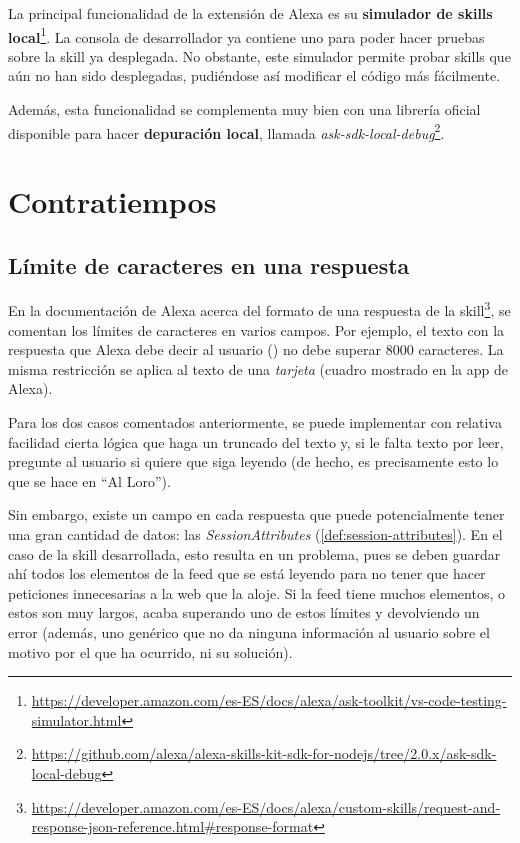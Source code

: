 \documentclass[11pt,spanish,listoffigures,listoftables,table,hyphens,dvipsnames]{tfgetsinf}
\newcommand{\fe}[1]{\foreign{english}{#1}}
\begin{document}
La principal funcionalidad de la extensión de Alexa es su
\textbf{simulador de skills local}\footnote{\url{https://developer.amazon.com/es-ES/docs/alexa/ask-toolkit/vs-code-testing-simulator.html}}.
La consola de desarrollador ya contiene uno para poder hacer pruebas sobre la skill ya desplegada. No obstante, este simulador permite probar skills que aún no han sido desplegadas, pudiéndose así modificar el código más fácilmente.

Además, esta funcionalidad se complementa muy bien con una librería oficial disponible para hacer \textbf{depuración local}, llamada \emph{ask-sdk-local-debug}\footnote{\url{https://github.com/alexa/alexa-skills-kit-sdk-for-nodejs/tree/2.0.x/ask-sdk-local-debug}}.

\section{Contratiempos}

\subsection{Límite de caracteres en una respuesta}
\label{seccion:limite-caracteres}

En la documentación de Alexa acerca del formato de una respuesta de la skill\footnote{\url{https://developer.amazon.com/es-ES/docs/alexa/custom-skills/request-and-response-json-reference.html\#response-format}}, se comentan los límites de caracteres en varios campos.
Por ejemplo, el texto con la respuesta que Alexa debe decir al usuario (\fe{outputSpeech}) no debe superar 8000 caracteres. La misma restricción se aplica al texto de una \emph{tarjeta} (cuadro mostrado en la app de Alexa).

Para los dos casos comentados anteriormente, se puede implementar con relativa facilidad cierta lógica que haga un truncado del texto y, si le falta texto por leer, pregunte al usuario si quiere que siga leyendo (de hecho, es precisamente esto lo que se hace en ``Al Loro'').

Sin embargo, existe un campo en cada respuesta que puede potencialmente tener una gran cantidad de datos: las \emph{SessionAttributes} (\ref{def:session-attributes}). En el caso de la skill desarrollada, esto resulta en un problema, pues se deben guardar ahí todos los elementos de la feed que se está leyendo para no tener que hacer peticiones innecesarias a la web que la aloje. Si la feed tiene muchos elementos, o estos son muy largos, acaba superando uno de estos límites y devolviendo un error (además, uno genérico que no da ninguna información al usuario sobre el motivo por el que ha ocurrido, ni su solución).
\end{document}
